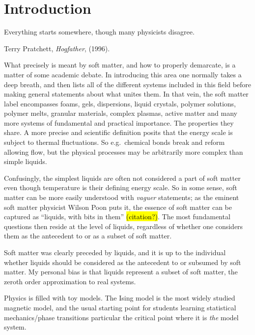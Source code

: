 \documentclass[11pt,twoside]{report}
\begin{document}
\chapter{Introduction}
\epigraph{Everything starts somewhere, though many physicists disagree.}{Terry Pratchett, \emph{Hogfather}, (1996).}

What precisely is meant by soft matter, and how to properly demarcate, is a matter of some academic debate.
In introducing this area one normally takes a deep breath, and then lists all of the different systems included in this field before making general statements about what unites them.
In that vein, the soft matter label encompasses foams, gels, dispersions, liquid crystals, polymer solutions, polymer melts, granular materials, complex plasmas, active matter and many more systems of fundamental and practical importance.
The properties they share.
A more precise and scientific definition posits that the energy scale is subject to thermal fluctuations.
So e.g.\ chemical bonds break and reform allowing flow, but the physical processes may be arbitrarily more complex than simple liquids.

Confusingly, the simplest liquids%
are often not considered a part of soft matter even though temperature is their defining energy scale.
So in some sense, soft matter can be more easily understood with \emph{vaguer} statements; as the eminent soft matter physicist Wilson Poon puts it, the essence of soft matter can be captured as ``liquids, with bits in them'' \hl{(citation?)}.
The most fundamental questions then reside at the level of liquids, regardless of whether one considers them as the antecedent to or as a subset of soft matter.

Soft matter was clearly preceded by liquids, and it is up to the individual whether liquids should be considered as the antecedent to or subsumed by soft matter.
My personal bias is that liquids represent a subset of soft matter, the zeroth order approximation to real systems.

Physics is filled with toy models.
The Ising model is the most widely studied magnetic model, and the usual starting point for students learning statistical mechanics/phase transitions particular the critical point where it is \emph{the} model system.
\end{document}

